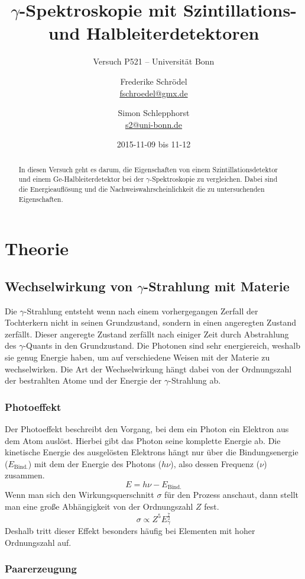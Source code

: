 \documentclass[11pt, ngerman, fleqn, DIV=15, headinclude, BCOR=2cm]{scrreprt}
\title{$\gamma$-Spektroskopie mit Szintillations- und Halbleiterdetektoren}
\subtitle{Versuch P521 -- Universität Bonn}
\author{
	Frederike Schrödel \\
	\small{\href{mailto:fschroedel@gmx.de}{fschroedel@gmx.de}}
	\and
	Simon Schlepphorst \\
	\small{\href{mailto:s2@uni-bonn.de}{s2@uni-bonn.de}}
}
\date{2015-11-09 bis 11-12}
\begin{document}
\maketitle

\begin{abstract}
    In diesen Versuch geht es darum, die Eigenschaften von einem
    Szintillationsdetektor und einem Ge-Halbleiterdetektor bei der
    $\gamma$-Spektroskopie zu vergleichen.
    Dabei sind die Energieauflösung und die Nachweiswahrscheinlichkeit die
    zu untersuchenden Eigenschaften.
\end{abstract}


\tableofcontents

\chapter{Theorie}

\section{Wechselwirkung von $\gamma$-Strahlung mit Materie}
Die $\gamma$-Strahlung entsteht wenn nach einem vorhergegangen Zerfall der
Tochterkern nicht in seinen Grundzustand, sondern in einen angeregten Zustand
zerfällt.
Dieser angeregte Zustand zerfällt nach einiger Zeit durch Abstrahlung des
$\gamma$-Quants in den Grundzustand. Die Photonen sind sehr energiereich,
weshalb sie genug Energie haben, um auf verschiedene Weisen mit der Materie zu
wechselwirken.
Die Art der Wechselwirkung hängt dabei von der Ordnungszahl der bestrahlten Atome
und der Energie der $\gamma$-Strahlung ab.

\subsection{Photoeffekt}
Der Photoeffekt beschreibt den Vorgang, bei dem ein Photon ein Elektron aus
dem Atom auslöst.
Hierbei gibt das Photon seine komplette Energie ab.
Die kinetische Energie des ausgelösten Elektrons hängt nur über die
Bindungsenergie ($E_\text{Bind.}$) mit dem der Energie des Photons ($h\nu$),
also dessen Frequenz ($\nu$) zusammen.
\[ 
    E = h\nu - E_\text{Bind.}
\]
Wenn man sich den Wirkungsquerschnitt $\sigma$ für den Prozess anschaut,
dann stellt man eine große Abhängigkeit von der Ordnungszahl $Z$ fest.
\[
    \sigma \propto Z^5 E_\gamma^{\frac 72}
\]
Deshalb tritt dieser Effekt besonders häufig bei Elementen mit hoher Ordnungszahl
auf.

\subsection{Paarerzeugung}
\end{document}
